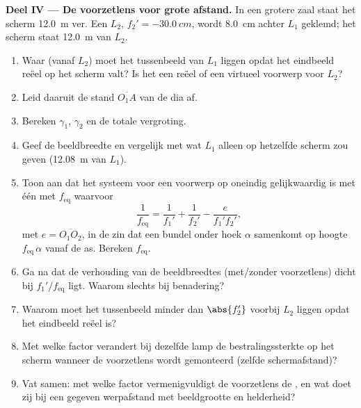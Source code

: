 \begin{problem}
\medskip
\noindent\textbf{Deel IV --- De voorzetlens voor grote afstand.}
In een grotere zaal staat het scherm \qty{12.0}{m} ver. Een 
$L_2$, $f_2' = \qty{-30.0}{cm}$, wordt \qty{8.0}{cm} achter $L_1$ geklemd;
het scherm staat \qty{12.0}{m} van $L_2$.
\begin{enumerate}[resume]
  \item Waar (vanaf $L_2$) moet het tussenbeeld van $L_1$ liggen opdat het
        eindbeeld reëel op het scherm valt? Is het een reëel of een virtueel
        voorwerp voor $L_2$?
  \item Leid daaruit de stand $\overline{O_1A}$ van de dia af.
  \item Bereken $\gamma_1$, $\gamma_2$ en de totale vergroting.
  \item Geef de beeldbreedte en vergelijk met wat $L_1$ alleen op hetzelfde
        scherm zou geven (\qty{12.08}{m} van $L_1$).
  \item Toon aan dat het systeem voor een voorwerp op oneindig gelijkwaardig
        is met één  met  $f_{\mathrm{eq}}$ waarvoor
        \[
        \frac{1}{f_{\mathrm{eq}}} = \frac{1}{f_1'} + \frac{1}{f_2'} - \frac{e}{f_1' f_2'},
        \]
        met $e = \overline{O_1O_2}$, in de zin dat een bundel onder hoek
        $\alpha$ samenkomt op hoogte $f_{\mathrm{eq}}\,\alpha$ vanaf de
        as. Bereken $f_{\mathrm{eq}}$.
  \item Ga na dat de verhouding van de beeldbreedtes (met/zonder voorzetlens)
        dicht bij $f_1'/f_{\mathrm{eq}}$ ligt. Waarom slechts bij benadering?
  \item Waarom moet het tussenbeeld minder dan $\abs{f_2'}$ voorbij $L_2$
        liggen opdat het eindbeeld reëel is?
  \item Met welke factor verandert bij dezelfde lamp de bestralingssterkte op
        het scherm wanneer de voorzetlens wordt gemonteerd (zelfde
        schermafstand)?
  \item Vat samen: met welke factor vermenigvuldigt de voorzetlens de
        , en wat doet zij bij een gegeven werpafstand met
        beeldgrootte en helderheid?
\end{enumerate}
\end{problem}
